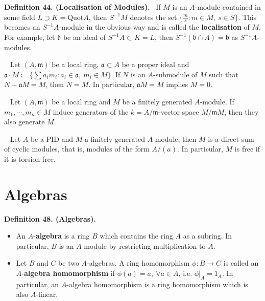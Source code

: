 \documentclass[12pt,a4paper,footinclude=true,headinclude=true]{scrbook} %
\newenvironment{theorem}[2][]
{\renewcommand\theinnercustomthm{#2}\innercustomthm[#1]
\begin{mdframed}[backgroundcolor=yellow!20]\ }
{\end{mdframed}\endinnercustomthm}
\newenvironment{corollary}[2][]
{\renewcommand\theinnercustomcol{#2}\innercustomcol[#1]
\begin{mdframed}[backgroundcolor=gray!20]\ }
{\end{mdframed}\endinnercustomcol}
\newenvironment{definition}[2][Definition]
    { \begin{mdframed}[backgroundcolor=gray!20] \textbf{#1 #2.}\ }
    {  \end{mdframed}}
\begin{document}
\begin{definition}{44. (Localisation of Modules)}
    If $M$ is an $A$-module contained in some field $L\supset K=\mathrm{Quot}A$, then $S^{-1}M$ denotes the set $\{\frac{m}{s}:m\in M,\ s\in S\}$. This becomes an $S^{-1}A$-module in the obvious way and is called the \textbf{localisation} of $M$. For example, let $\mathfrak{b}$ be an ideal of $S^{-1}A\subset K=L$, then $S^{-1}(\mathfrak{b}\cap A)=\mathfrak{b}$ as $S^{-1}A$-modules.
\end{definition}

\begin{theorem}{45. (Nakayama's Lemma)}
    Let $(A,\mathfrak{m})$ be a local ring, $\mathfrak{a}\subset A$ be a proper ideal and $\mathfrak{a}\cdot M\coloneqq\{\sum a_im_i:a_i\in \mathfrak{a},\ m_i\in M\}$. If $N$ is an $A$-submodule of $M$ such that $N+\mathfrak{a}M=M$, then $N=M$. In particular, $\mathfrak{a}M =M$ implies $M=0$.
\end{theorem}

\begin{corollary}{46}
    Let $(A,\mathfrak{m})$ be a local ring and $M$ be a finitely generated $A$-module. If $m_1,\cdots,m_n\in M$ induce generators of the $k=A/\mathfrak{m}$-vector space $M/\mathfrak{m}M$, then they also generate $M$.
\end{corollary}

\begin{theorem}{47. (Modules over PID)}
    Let $A$ be a PID and $M$ a finitely generated $A$-module, then $M$ is a direct sum of cyclic modules, that is, modules of the form $A/(a)$. In particular, $M$ is free if it is torsion-free.
\end{theorem}

\newpage

\section{Algebras}
\begin{definition}{48. (Algebras)}
    \begin{itemize}
        \item An $A$-\textbf{algebra} is a ring $B$ which contains the ring $A$ as a subring. In particular, $B$ is an $A$-module by restricting multiplication to $A$.
        \item Let $B$ and $C$ be two $A$-algebras. A ring homomorphism $\phi:B\to C$ is called an $A$-\textbf{algebra homomorphism} if $\phi(a)=a,\ \forall a\in A$, i.e. $\phi|_A=1_A$. In particular, an $A$-algebra homomorphism is a ring homomorphism which is also $A$-linear.
    \end{itemize}
\end{definition}
\end{document}
